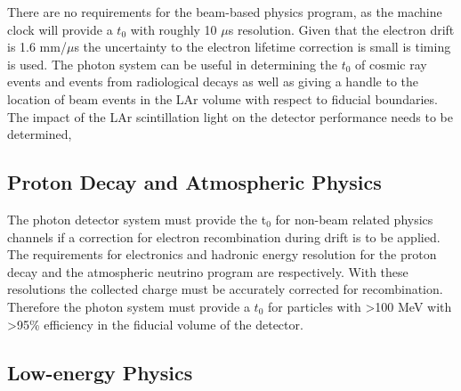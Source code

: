 There are no requirements for the beam-based physics program, as the
machine clock will provide a $t_{0}$ with roughly 10 $\mu$s
resolution. Given that the electron drift is 1.6 mm/$\mu$s the
uncertainty to the electron lifetime correction is small is %
timing is used. The photon system can be useful in determining the
$t_{0}$ of cosmic ray events and events from radiological decays as
well as giving a handle to the location of beam events in the LAr
volume with respect to fiducial boundaries. The impact of the LAr
scintillation light on the detector performance needs to be
determined,

\subsection{Proton Decay and Atmospheric Physics}

The photon detector system must provide the t$_0$ for non-beam related
physics channels if a correction for electron recombination during
drift is to be applied. The requirements for electronics and hadronic
energy resolution for the proton decay and the atmospheric neutrino
program are respectively. With these resolutions the collected
charge must be accurately corrected for recombination. Therefore the
photon system must provide a $t_{0}$ for particles with >100 MeV with
>95\% efficiency in the fiducial volume of the detector.

\subsection{Low-energy Physics}

